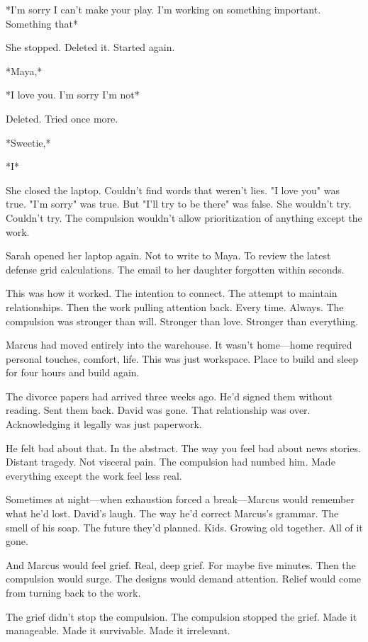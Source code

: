 *I'm sorry I can't make your play. I'm working on something important. Something that*

She stopped. Deleted it. Started again.

*Maya,*

*I love you. I'm sorry I'm not*

Deleted. Tried once more.

*Sweetie,*

*I*

She closed the laptop. Couldn't find words that weren't lies. "I love you" was true. "I'm sorry" was true. But "I'll try to be there" was false. She wouldn't try. Couldn't try. The compulsion wouldn't allow prioritization of anything except the work.

Sarah opened her laptop again. Not to write to Maya. To review the latest defense grid calculations. The email to her daughter forgotten within seconds.

This was how it worked. The intention to connect. The attempt to maintain relationships. Then the work pulling attention back. Every time. Always. The compulsion was stronger than will. Stronger than love. Stronger than everything.

\scenebreak

Marcus had moved entirely into the warehouse. It wasn't home—home required personal touches, comfort, life. This was just workspace. Place to build and sleep for four hours and build again.

The divorce papers had arrived three weeks ago. He'd signed them without reading. Sent them back. David was gone. That relationship was over. Acknowledging it legally was just paperwork.

He felt bad about that. In the abstract. The way you feel bad about news stories. Distant tragedy. Not visceral pain. The compulsion had numbed him. Made everything except the work feel less real.

Sometimes at night—when exhaustion forced a break—Marcus would remember what he'd lost. David's laugh. The way he'd correct Marcus's grammar. The smell of his soap. The future they'd planned. Kids. Growing old together. All of it gone.

And Marcus would feel grief. Real, deep grief. For maybe five minutes. Then the compulsion would surge. The designs would demand attention. Relief would come from turning back to the work.

The grief didn't stop the compulsion. The compulsion stopped the grief. Made it manageable. Made it survivable. Made it irrelevant.

